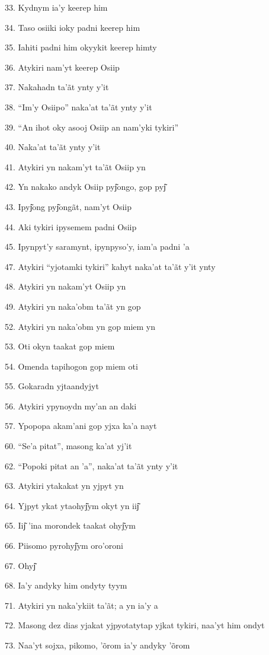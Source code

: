 33. Kydnym ia'y keerep him

34. Taso osiiki ioky padni keerep him

35. Iahiti padni him okyykit keerep himty

36. Atykiri nam'yt keerep Osiip

37. Nakahadn ta'ãt ynty y'it

38. ``Im'y Osiipo'' naka'at ta'ãt ynty y'it

39. ``An ihot oky asooj Osiip an nam'yki tykiri''

40. Naka'at ta'ãt ynty y'it

41. Atykiri yn nakam'yt ta'ãt Osiip yn

42. Yn nakako andyk Osiip pyj͂ongo, gop pyj͂

43. Ipyj͂ong pyj͂ongãt, nam'yt Osiip

44. Aki tykiri ipysemem padni Osiip

45. Ipynpyt'y saramynt, ipynpyso'y, iam'a padni 'a

47. Atykiri ``yjotamki tykiri'' kahyt naka'at ta'ãt y'it ynty

48. Atykiri yn nakam'yt Osiip yn

49. Atykiri yn naka'obm ta'ãt yn gop

52. Atykiri yn naka'obm yn gop miem yn

53. Oti okyn taakat gop miem

54. Omenda tapihogon gop miem oti

55. Gokaradn yjtaandyjyt

56. Atykiri ypynoydn my'an an daki

57. Ypopopa akam'ani gop yjxa ka'a nayt

60. ``Se'a pitat'', masong ka'at yj'it

62. ``Popoki pitat an 'a'', naka'at ta'ãt ynty y'it

63. Atykiri ytakakat yn yjpyt yn

64. Yjpyt ykat ytaohyj͂ym okyt yn iij͂

65. Iij͂ 'ina morondek taakat ohyj͂ym

66. Piisomo pyrohyj͂ym oro'oroni

67. Ohyj͂

68. Ia'y andyky him ondyty tyym

71. Atykiri yn naka'ykiit ta'ãt; a yn ia'y a

72. Masong dez dias yjakat yjpyotatytap yjkat tykiri, naa'yt him ondyt

73. Naa'yt sojxa, pikomo, 'õrom ia'y andyky 'õrom

